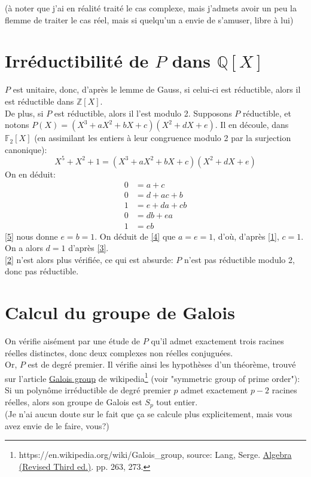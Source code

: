 \documentclass[a4paper, 12pt]{article}
\begin{document}
	(à noter que j'ai en réalité traité le cas complexe, mais j'admets avoir un peu la flemme de traiter le cas réel, mais si quelqu'un a envie de s'amuser, libre à lui)

	\section{Irréductibilité de $P$ dans $\mathbb Q [X]$}
	$P$ est unitaire, donc, d'après le lemme de Gauss\footnotemark, si celui-ci est réductible, alors il est réductible dans $\mathbb Z [X]$.\\
	De plus, si $P$ est réductible, alors il l'est modulo 2. Supposons $P$ réductible, et notons $P(X) = (X^3 + a X^2 + bX + c) (X^2+ dX + e)$. Il en découle, dans $\mathbb F_2[X]$ (en assimilant les entiers à leur congruence modulo 2 par la surjection canonique):
	$$ X^5 + X^2 + 1 = (X^3 + a X^2 + bX + c) (X^2+ dX + e)$$
	On en déduit:
	\begin{align}
		0 & = a+c  \label{1} \\
		0 & = d + ac + b  \label{2} \\
		1 & = e + da + cb  \label{3} \\
		0 & = db + ea \label{4} \\
		1 & = eb  \label{5}
	\end{align}
	\eqref{5} nous donne $e=b=1$. On déduit de \eqref{4} que $a=e=1$, d'où, d'après \eqref{1}, $c=1$. On a alors $d=1$ d'après \eqref{3}. \\
	\eqref{2} n'est alors plus vérifiée, ce qui est absurde: $P$ n'est pas réductible modulo 2, donc pas réductible. \\

	
	\section{Calcul du groupe de Galois}
	On vérifie aisément par une étude de $P$ qu'il admet exactement trois racines réelles distinctes, donc deux complexes non réelles conjuguées. \\
	Or, $P$ est de degré premier. Il vérifie ainsi les hypothèses d'un théorème, trouvé sur l'article \underline{Galois group} de wikipedia\footnote{https://en.wikipedia.org/wiki/Galois\_group, source: Lang, Serge. \underline{Algebra (Revised Third ed.)}. pp. 263, 273.} (voir "symmetric group of prime order"): Si un polynôme irréductible de degré premier $p$ admet exactement $p-2$ racines réelles, alors son groupe de Galois est $S_p$ tout entier.  \\
	(Je n'ai aucun doute sur le fait que ça se calcule plus explicitement, mais vous avez envie de le faire, vous?)
	
\end{document}
